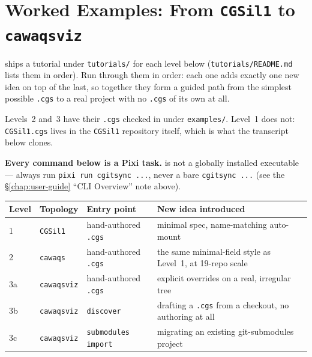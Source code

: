\section{Worked Examples: From \texttt{CGSil1} to \texttt{cawaqsviz}}
\label{sec:worked-examples}

\cgspkg{} ships a tutorial under \texttt{tutorials/} for
each level below (\texttt{tutorials/README.md} lists them in order). Run
through them in order: each one adds exactly one new idea on top of the
last, so together they form a guided path from the simplest possible
\texttt{.cgs} to a real project with no \texttt{.cgs} of its own at all.

Levels~2 and~3 have their \texttt{.cgs} checked in under
\texttt{examples/}. Level~1 does not: \texttt{CGSil1.cgs} lives in the
\texttt{CGSil1} repository itself, which is what the transcript below
clones.

\textbf{Every command below is a Pixi task.} \cgscli{} is not a globally
installed executable --- always run \texttt{pixi run cgitsync ...}, never a
bare \texttt{cgitsync ...} (see the \S\ref{chap:user-guide} ``CLI
Overview'' note above).

\begin{center}
\begin{tabular}{lllp{5.3cm}}
\textbf{Level} & \textbf{Topology} & \textbf{Entry point} & \textbf{New idea introduced} \\
\hline
1 & \texttt{CGSil1} & hand-authored \texttt{.cgs} & minimal spec, name-matching auto-mount \\
2 & \texttt{cawaqs} & hand-authored \texttt{.cgs} & the same minimal-field style as Level~1, at 19-repo scale \\
3a & \texttt{cawaqsviz} & hand-authored \texttt{.cgs} & explicit overrides on a real, irregular tree \\
3b & \texttt{cawaqsviz} & \texttt{discover} & drafting a \texttt{.cgs} from a checkout, no authoring at all \\
3c & \texttt{cawaqsviz} & \texttt{submodules import} & migrating an existing git-submodules project \\
\end{tabular}
\end{center}

